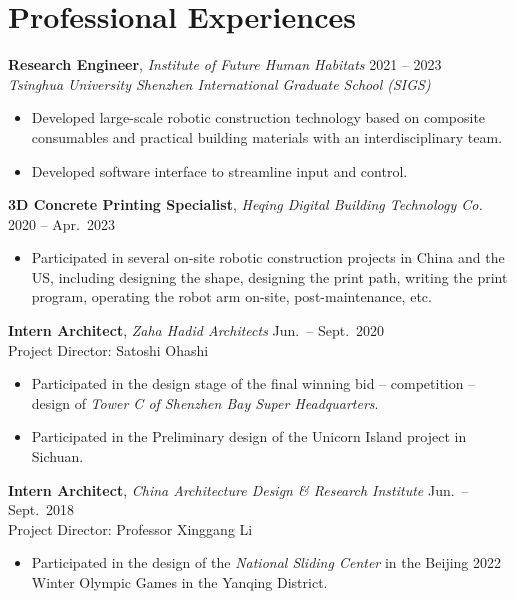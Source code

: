 \documentclass[11pt,a4paper]{article}
\newcommand{\entrytitle}[1]{\textbf{#1}}
\newcommand{\entrydetail}[1]{\textit{#1}}
\begin{document}
\section{Professional Experiences}

\entrytitle{Research Engineer}, \entrydetail{Institute of Future Human Habitats} \hfill 2021 -- 2023 \\
\entrydetail{Tsinghua University Shenzhen International Graduate School (SIGS)}
\begin{itemize}[nosep, leftmargin=1.5em]
    \item Developed large-scale robotic construction technology based on composite consumables and practical building materials with an interdisciplinary team.
    \item Developed software interface to streamline input and control.
\end{itemize}

\entrytitle{3D Concrete Printing Specialist}, \entrydetail{Heqing Digital Building Technology Co.} \hfill 2020 -- Apr.\ 2023
\begin{itemize}[nosep, leftmargin=1.5em]
    \item Participated in several on-site robotic construction projects in China and the US, including designing the shape, designing the print path, writing the print program, operating the robot arm on-site, post-maintenance, etc.
\end{itemize}

\entrytitle{Intern Architect}, \entrydetail{Zaha Hadid Architects} \hfill Jun.\ -- Sept.\ 2020 \\
Project Director: Satoshi Ohashi
\begin{itemize}[nosep, leftmargin=1.5em]
    \item Participated in the design stage of the final winning bid -- competition -- design of \textit{Tower C of Shenzhen Bay Super Headquarters}.
    \item Participated in the Preliminary design of the Unicorn Island project in Sichuan.
\end{itemize}

\entrytitle{Intern Architect}, \entrydetail{China Architecture Design \& Research Institute} \hfill Jun.\ -- Sept.\ 2018 \\
Project Director: Professor Xinggang Li
\begin{itemize}[nosep, leftmargin=1.5em]
    \item Participated in the design of the \textit{National Sliding Center} in the Beijing 2022 Winter Olympic Games in the Yanqing District.
\end{itemize}
\end{document}
